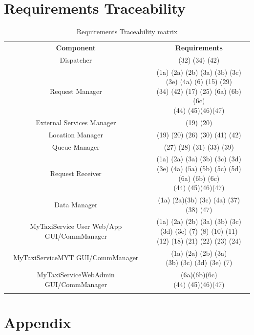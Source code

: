 \documentclass[11pt,titlepage]{article} %
\begin{document}
\section{Requirements Traceability}
	\begin{table}[h]
		\centering
		\begin{tabular}{|| c || c ||}
			\hhline{|t:==:t|}
  			\textbf{Component} & \textbf{Requirements} \\
			\hhline{|:=|=:|}
 			Dispatcher & (32)  (34) (42)\\
			\hhline{|:-|-:|}
 			Request Manager &  \pbox{10cm}{(1a) (2a) (2b) (3a) (3b) (3c)\\ (3e) (4a) (6) (15) (29) \\ (34) (42) (17) (25) (6a) (6b)(6c)\\  (44) (45)(46)(47)} \\
			\hhline{|:-|-:|}
 			External Services Manager &  (19) (20)\\
			\hhline{|:-|-:|}
 			Location Manager & (19) (20) (26) (30) (41) (42)\\
			\hhline{|:-|-:|}
 			Queue Manager &  (27) (28) (31) (33) (39)\\
			\hhline{|:-|-:|}
 			Request Receiver &\pbox{10cm}{(1a) (2a) (3a) (3b) (3c) (3d)\\ (3e) (4a) (5a) (5b) (5c) (5d)\\(6a) (6b) (6c) \\  (44) (45)(46)(47)}\\
			\hhline{|:-|-:|}
 			Data Manager &  (1a) (2a)(3b) (3c) (4a) (37) (38) (47)\\
			\hhline{|:-|-:|}
 			MyTaxiService User Web/App GUI/CommManager & \pbox{10cm}{(1a) (2a) (2b) (3a) (3b) (3c) \\ (3d) (3e) (7) (8) (10) (11) \\ (12) (18) (21) (22) (23) (24)} \\
			\hhline{|:-|-:|}
 			MyTaxiServiceMYT GUI/CommManager &  \pbox{10cm}{(1a) (2a) (2b) (3a) \\ (3b) (3c) (3d) (3e) (7)}\\
			\hhline{|:-|-:|}
			MyTaxiServiceWebAdmin GUI/CommManager &   \pbox{10cm}{(6a)(6b)(6c) \\ (44) (45)(46)(47)}\\ 
			\hhline{|b:==:b|}
		\end{tabular}
		\caption{Requirements Traceability matrix}
\end{table}

\newpage
\section{Appendix}
\end{document}

